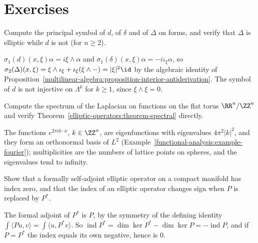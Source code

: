 \section{Exercises}\label{elliptic-operators:section-exercises}

\begin{exercise}\label{elliptic-operators:exercise-symbol-laplacian}
Compute the principal symbol of $d$, of $\delta$ and of $\Delta$ on forms, and verify that $\Delta$ is elliptic while $d$ is not (for $n \geq 2$).
\end{exercise}

\begin{solution}
$\sigma_1(d)(x, \xi)\alpha = i\xi \wedge \alpha$ and $\sigma_1(\delta)(x, \xi)\alpha = -i\iota_\xi\alpha$, so
$\sigma_2(\Delta)(x, \xi) = \xi \wedge \iota_\xi + \iota_\xi(\xi \wedge -) = |\xi|^2\id$ by the algebraic identity of
Proposition~\ref{multilinear-algebra:proposition-interior-antiderivation}. The symbol of $d$ is not injective on $\Lambda^k$ for $k \geq 1$, since $\xi \wedge \xi = 0$.
\end{solution}

\begin{exercise}\label{elliptic-operators:exercise-eigenvalues-torus}
Compute the spectrum of the Laplacian on functions on the flat torus $\RR^n/\ZZ^n$ and verify Theorem~\ref{elliptic-operators:theorem-spectral} directly.
\end{exercise}

\begin{solution}
The functions $e^{2\pi ik\cdot x}$, $k \in \ZZ^n$, are eigenfunctions with eigenvalues $4\pi^2|k|^2$, and they form an orthonormal basis of $L^2$
(Example~\ref{functional-analysis:example-fourier}); multiplicities are the numbers of lattice points on spheres, and the eigenvalues tend to infinity.
\end{solution}

\begin{exercise}\label{elliptic-operators:exercise-index-self-adjoint}
Show that a formally self-adjoint elliptic operator on a compact manifold has index zero, and that the index of an elliptic operator changes sign when $P$ is replaced by $P^*$.
\end{exercise}

\begin{solution}
The formal adjoint of $P^*$ is $P$, by the symmetry of the defining identity $\int\langle Pu, v\rangle = \int\langle u, P^*v\rangle$. So
$\operatorname{ind}P^* = \dim\ker P^* - \dim\ker P = -\operatorname{ind}P$, and if $P = P^*$ the index equals its own negative, hence is $0$.
\end{solution}

